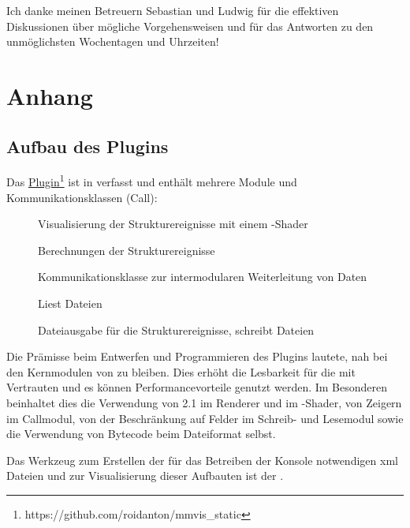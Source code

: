 Ich danke meinen Betreuern Sebastian und Ludwig für die effektiven Diskussionen über mögliche Vorgehensweisen und für das Antworten zu den unmöglichsten Wochentagen und Uhrzeiten!



\appendix

\chapter{Anhang}

\section{Aufbau des Plugins}\label{sec:pluginaufbau}
Das \href{https://github.com/roidanton/mmvis_static}{Plugin}\footnote{https://github.com/roidanton/mmvis\_static} ist in  verfasst und enthält mehrere Module und Kommunikationsklassen (Call):
\begin{description}
	\item [] Visualisierung der Strukturereignisse mit einem -Shader
	\item [] Berechnungen der Strukturereignisse
	\item [] Kommunikationsklasse zur intermodularen Weiterleitung von Daten
	\item [] Liest \MMSE Dateien
	\item [] Dateiausgabe für die Strukturereignisse, schreibt \MMSE Dateien
\end{description}

Die Prämisse beim Entwerfen und Programmieren des Plugins lautete, nah bei den Kernmodulen von  zu bleiben. Dies erhöht die Lesbarkeit für die mit  Vertrauten und es können Performancevorteile genutzt werden. Im Besonderen beinhaltet dies die Verwendung von  2.1 im Renderer und im -Shader, von Zeigern im Callmodul, von der Beschränkung auf Felder im Schreib- und Lesemodul sowie die Verwendung von Bytecode beim Dateiformat selbst.

Das Werkzeug zum Erstellen der für das Betreiben der  Konsole notwendigen \gls{xml} Dateien und zur Visualisierung dieser Aufbauten ist der .

